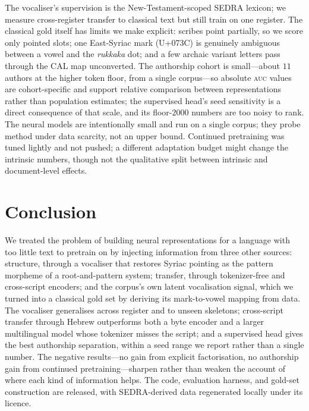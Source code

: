 \documentclass[11pt]{article}
\newcommand{\auc}{\textsc{auc}}
\begin{document}
The vocaliser's supervision is the New-Testament-scoped SEDRA lexicon; we measure
cross-register transfer to classical text but still train on one register. The
classical gold itself has limits we make explicit: scribes point partially, so we
score only pointed slots; one East-Syriac mark (U+073C) is genuinely ambiguous
between a vowel and the \emph{rukkaka} dot; and a few archaic variant letters pass
through the CAL map unconverted. The authorship cohort is small---about $11$
authors at the higher token floor, from a single corpus---so absolute \auc{} values
are cohort-specific and support relative comparison between representations rather
than population estimates; the supervised head's seed sensitivity is a direct
consequence of that scale, and its floor-$2000$ numbers are too noisy to rank. The
neural models are intentionally small and run on a single corpus; they probe
method under data scarcity, not an upper bound. Continued pretraining was tuned
lightly and not pushed; a different adaptation budget might change the intrinsic
numbers, though not the qualitative split between intrinsic and document-level
effects.

\section{Conclusion}
\label{sec:conclusion}

We treated the problem of building neural representations for a language with too
little text to pretrain on by injecting information from three other sources:
structure, through a vocaliser that restores Syriac pointing as the pattern
morpheme of a root-and-pattern system; transfer, through tokenizer-free and
cross-script encoders; and the corpus's own latent vocalisation signal, which we
turned into a classical gold set by deriving its mark-to-vowel mapping from data.
The vocaliser generalises across register and to unseen skeletons; cross-script
transfer through Hebrew outperforms both a byte encoder and a larger multilingual
model whose tokenizer misses the script; and a supervised head gives the best
authorship separation, within a seed range we report rather than a single number.
The negative results---no gain from explicit factorisation, no authorship gain from
continued pretraining---sharpen rather than weaken the account of where each kind of
information helps. The code, evaluation harness, and gold-set construction are
released, with SEDRA-derived data regenerated locally under its licence.
\end{document}
